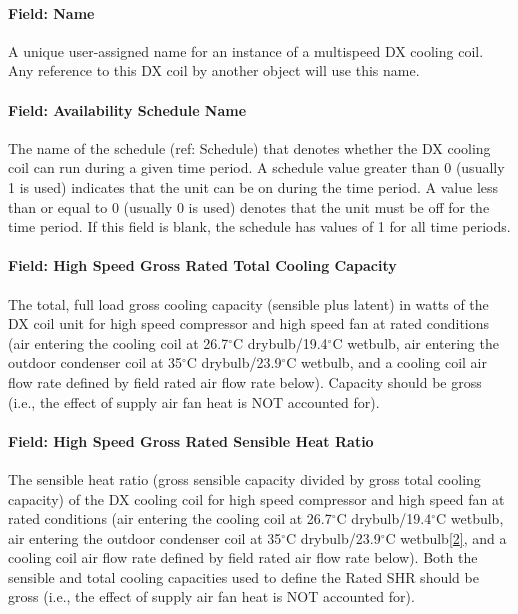 \paragraph{Field: Name}\label{field-name-13-003}

A unique user-assigned name for an instance of a multispeed DX cooling coil. Any reference to this DX coil by another object will use this name.

\paragraph{Field: Availability Schedule Name}\label{field-availability-schedule-name-7-001}

The name of the schedule (ref: Schedule) that denotes whether the DX cooling coil can run during a given time period. A schedule value greater than 0 (usually 1 is used) indicates that the unit can be on during the time period. A value less than or equal to 0 (usually 0 is used) denotes that the unit must be off for the time period. If this field is blank, the schedule has values of 1 for all time periods.

\paragraph{Field: High Speed Gross Rated Total Cooling Capacity}\label{field-high-speed-gross-rated-total-cooling-capacity}

The total, full load gross cooling capacity (sensible plus latent) in watts of the DX coil unit for high speed compressor and high speed fan at rated conditions (air entering the cooling coil at 26.7$^\circ$C drybulb/19.4$^\circ$C wetbulb, air entering the outdoor condenser coil at 35$^\circ$C drybulb/23.9$^\circ$C wetbulb, and a cooling coil air flow rate defined by field rated air flow rate below). Capacity should be gross (i.e., the effect of supply air fan heat is NOT accounted for).

\paragraph{Field: High Speed Gross Rated Sensible Heat Ratio}\label{field-high-speed-gross-rated-sensible-heat-ratio}

The sensible heat ratio (gross sensible capacity divided by gross total cooling capacity) of the DX cooling coil for high speed compressor and high speed fan at rated conditions (air entering the cooling coil at 26.7$^\circ$C drybulb/19.4$^\circ$C wetbulb, air entering the outdoor condenser coil at 35$^\circ$C drybulb/23.9$^\circ$C wetbulb\protect\hyperlink{ux5fftn2}{{[}2{]}}, and a cooling coil air flow rate defined by field rated air flow rate below). Both the sensible and total cooling capacities used to define the Rated SHR should be gross (i.e., the effect of supply air fan heat is NOT accounted for).

